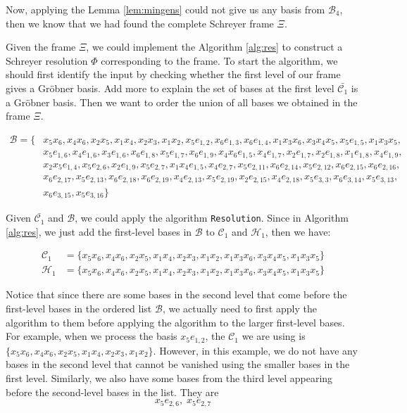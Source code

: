 \documentclass{article}
\theoremstyle{definition}
\theoremstyle{remark}
\theoremstyle{example}
\begin{document}
Now, applying the Lemma \ref{lem:mingens} could not give us any basis from $\mathcal{B}_4$, then we know that we had found the complete Schreyer frame $\Xi$.

Given the frame $\Xi$, we could implement the Algorithm \ref{alg:res} to construct a Schreyer resolution $\Phi$ corresponding to the frame. To start the algorithm, we should first identify the input by checking whether the first level of our frame gives a Gröbner basis. \textcolor{BrickRed}{Add more to explain the set of bases at the first level $\bar{\mathcal{C}_1}$ is a Gröbner basis}. Then we want to order the union of all bases we obtained in the frame $\Xi$.

\begin{equation}
    \begin{aligned}
        \mathcal{B} = \{&x_5x_6,x_4x_6,x_2x_5,x_1x_4,x_2x_3,x_1x_2,x_5e_{1,2},x_6e_{1,3},x_6e_{1,4},x_1x_3x_6,x_3x_4x_5,x_5e_{1,5},x_1x_3x_5, \\
                    & x_5e_{1,6},x_4e_{1,6},x_3e_{1,6},x_6e_{1,8},x_5e_{1,7},x_6e_{1,9},x_4x_6e_{1,5},x_4e_{1,7},x_2e_{1,7},x_2e_{1,8},x_1e_{1,8},x_4e_{1,9},\\
                    & x_2x_5e_{1,4},x_5e_{2,6},x_2e_{1,9},x_5e_{2,7},x_1x_4e_{1,5},x_4e_{2,7},x_5e_{2,11},x_6e_{2,14},x_5e_{2,12},x_6e_{2,15},x_6e_{2,16},\\
                    & x_6e_{2,17},x_5e_{2,13},x_6e_{2,18}, x_6e_{2,19},x_4e_{2,13},x_5e_{2,19},x_2e_{2,15},x_4e_{2,18},x_5e_{3,3},x_6e_{3,14},x_5e_{3,13},\\
                    & x_6e_{3,15},x_5e_{3,16}\}
    \end{aligned}
\end{equation}

Given $\bar{\mathcal{C}_1}$ and $\mathcal{B}$, we could apply the algorithm \verb+Resolution+. Since in Algorithm \ref{alg:res}, we just add the first-level bases in $\mathcal{B}$ to $\mathcal{C}_1$ and $\mathcal{H}_1$, then we have:

\begin{align}
        \mathcal{C}_1 &= \{x_5x_6,x_4x_6,x_2x_5,x_1x_4,x_2x_3,x_1x_2,x_1x_3x_6,x_3x_4x_5,x_1x_3x_5\}\\
        \mathcal{H}_1 &= \{x_5x_6,x_4x_6,x_2x_5,x_1x_4,x_2x_3,x_1x_2,x_1x_3x_6,x_3x_4x_5,x_1x_3x_5\}
\end{align}

Notice that since there are some bases in the second level that come before the first-level bases in the ordered list $\mathcal{B}$, we actually need to first apply the algorithm to them before applying the algorithm to the larger first-level bases. For example, when we process the basis $x_5e_{1,2}$, the $\mathcal{C}_1$ we are using is $\{x_5x_6,x_4x_6,x_2x_5,x_1x_4,x_2x_3,x_1x_2\}$. However, in this example, we do not have any bases in the second level that cannot be vanished using the smaller bases in the first level. Similarly, we also have some bases from the third level appearing before the second-level bases in the list. They are 
\begin{equation}
    x_5e_{2,6},\;x_5e_{2,7}
\end{equation}
\end{document}

